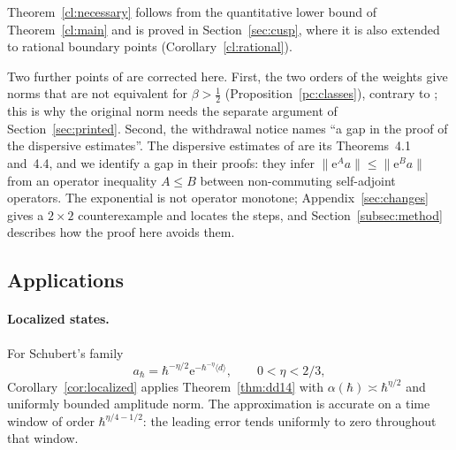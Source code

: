 \documentclass[twoside,10pt]{article}
\numberwithin{equation}{section}
\theoremstyle{slbody}
\theoremstyle{remark}
\newcommand{\norm}[1]{\lVert #1\rVert}
\newcommand{\ue}{\mathrm{e}}
\begin{document}
Theorem~\ref{cl:necessary} follows from the quantitative lower bound of Theorem~\ref{cl:main} and is proved in
Section~\ref{sec:cusp}, where it is also extended to rational boundary points (Corollary~\ref{cl:rational}).

Two further points of \cite{S} are corrected here. First, the two orders of the weights give norms that are not
equivalent for $\beta>\tfrac12$ (Proposition~\ref{pc:classes}), contrary to \cite[Proposition~7.1, (7.2)]{S}; this is
why the original norm needs the separate argument of Section~\ref{sec:printed}. Second, the withdrawal notice names ``a gap
in the proof of the dispersive estimates''. The dispersive estimates of \cite{S} are its Theorems~4.1 and~4.4, and we identify a
gap in their proofs: they infer $\norm{\ue^Aa}\le\norm{\ue^Ba}$ from an operator inequality $A\le B$ between non-commuting
self-adjoint operators. The exponential is not operator monotone; Appendix~\ref{sec:changes} gives a $2\times2$ counterexample
and locates the steps, and Section~\ref{subsec:method} describes how the proof here avoids them.

\subsection{Applications}\label{subsec:applications}
\paragraph{Localized states.}
For Schubert's family \cite[Remark~1.7, (1.38)]{S}
\[
 a_\hbar=\hbar^{-\eta/2}\ue^{-\hbar^{-\eta}\langle d\rangle},\qquad 0<\eta<2/3,
\]
Corollary~\ref{cor:localized} applies Theorem~\ref{thm:dd14} with
$\alpha(\hbar)\asymp\hbar^{\eta/2}$ and uniformly bounded amplitude norm.
The approximation is accurate on a time window of order $\hbar^{\eta/4-1/2}$:
the leading error tends uniformly to zero throughout that window.
\end{document}
